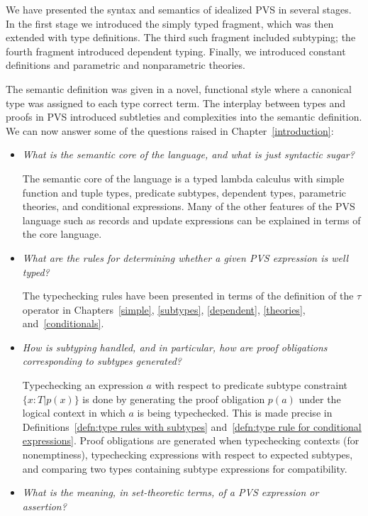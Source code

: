 \documentclass [12pt,twoside]{cslreport}
\newcommand{\subtype}[3]{\{#1 : #2 | #3 \}}
\begin{document}
We have presented the syntax and semantics of idealized PVS in several
stages.  In the first stage we introduced the simply typed fragment,
which was then extended with type definitions.  The third such fragment
included subtyping;  the fourth fragment introduced dependent typing.
Finally, we introduced constant definitions and parametric and nonparametric
theories.

The semantic definition was given in a novel, functional style where a
canonical type was assigned to each type correct term.  The interplay between
types and proofs in PVS introduced subtleties and complexities
into the semantic definition.  We can now answer some of the questions
raised in Chapter~\ref{introduction}:
\begin{itemize}
\item {\em What is the semantic core of the language, and what is
just syntactic sugar?}

The semantic core of the language is a typed lambda calculus with
simple function and tuple types, predicate subtypes, dependent types,
parametric theories, and conditional expressions.  Many of the other
features of the PVS language such as records and update expressions
can be explained in terms of the core language.

\item {\em What are the rules for determining whether a given PVS
expression is well typed?  }

The typechecking rules have been presented in terms of the definition of
the $\tau$ operator in Chapters~\ref{simple},  \ref{subtypes},
\ref{dependent}, \ref{theories}, and~\ref{conditionals}\@. 

\item {\em How is subtyping handled, and in particular, how are
proof obligations corresponding to subtypes generated?}

Typechecking an expression $a$ with respect to predicate subtype
constraint $\subtype{x}{T}{p(x)}$
is done by generating the proof obligation $p(a)$ under the logical
context in which $a$ is being typechecked.  This is made precise
in Definitions~\ref{defn:type rules with subtypes} and~\ref{defn:type rule
for conditional expressions}\@.  
Proof obligations are generated when typechecking contexts (for
nonemptiness),  typechecking expressions with respect to expected subtypes, 
and  comparing two types containing subtype expressions for
compatibility.

\item  {\em What is the meaning, in set-theoretic terms, of a PVS expression or
assertion?}


\end{itemize}
\end{document}
